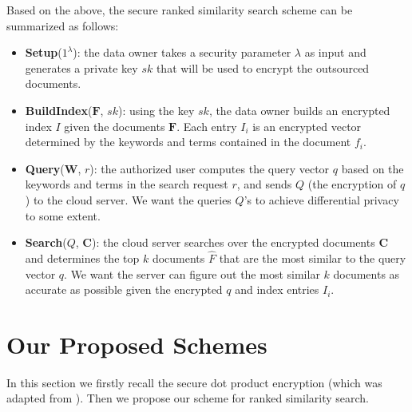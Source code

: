 \documentclass{article}
\begin{document}
Based on the above, the secure ranked similarity search scheme can be summarized as follows:
\begin{itemize}
\item \textbf{Setup}($1^\lambda$): the data owner takes a security parameter $\lambda$ as input and generates a private key $sk$ that will be used to encrypt the outsourced documents.
\item \textbf{BuildIndex}($\mathbf{F}$, $sk$): using the key $sk$, the data owner builds an encrypted index $I$ given the documents $\mathbf{F}$. Each entry $I_i$ is an encrypted vector determined by the keywords and terms contained in the document $f_i$.
\item \textbf{Query}($\mathbf{W}$, $r$): the authorized user computes the query vector $q$ based on the keywords and terms in the search request $r$, and sends $Q$ (the encryption of $q$) to the cloud server. We want the queries $Q$'s to achieve differential privacy to some extent.
\item \textbf{Search}($Q$, $\mathbf{C}$): the cloud server searches over the encrypted documents $\mathbf{C}$ and determines the top $k$ documents $\hat{F}$ that are the most similar to the query vector $q$. We want the server can figure out the most similar $k$ documents as accurate as possible given the encrypted $q$ and index entries $I_i$.
\end{itemize}

\section{Our Proposed Schemes}
In this section we firstly recall the secure dot product encryption \cite{Cao14} (which was adapted from \cite{Wong09}). Then we propose our scheme for ranked similarity search.
\end{document}
